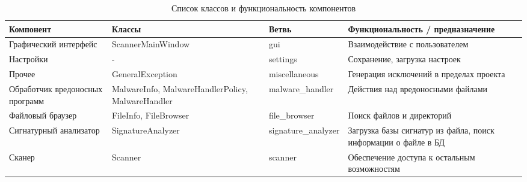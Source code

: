 \begin{table}[h]
\centering
\begin{tabular}{|p{25mm}|p{4cm}|l|p{4cm}|}
\hline
Компонент & Классы & Ветвь & Функциональность / предназначение \\
\hline
Графический интерфейс & ScannerMainWindow & gui
& Взаимодействие с пользователем \\
\hline
Настройки & - & settings & Сохранение, загрузка настроек \\
\hline
Прочее & GeneralException & miscellaneous
& Генерация исключений в пределах проекта \\
\hline
Обработчик вредоносных программ
& MalwareInfo, MalwareHandlerPolicy, MalwareHandler
& malware\_handler & Действия над вредоносными файлами \\
\hline
Файловый браузер & FileInfo, FileBrowser & file\_browser
& Поиск файлов и директорий \\
\hline
Сигнатурный анализатор & SignatureAnalyzer & signature\_analyzer
& Загрузка базы сигнатур из файла, поиск информации о файле в БД \\
\hline
Сканер & Scanner & scanner & Обеспечение доступа к остальным возможностям \\
\hline
\end{tabular}
\caption{Список классов и функциональность компонентов}
\label{table:components}
\end{table}
